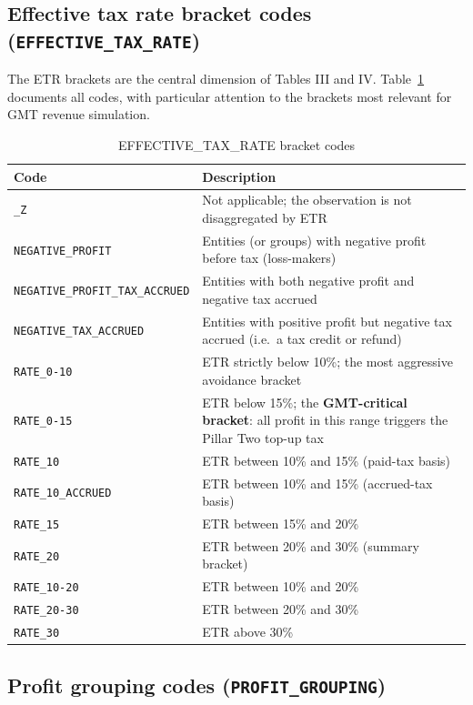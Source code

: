 \documentclass[11pt,a4paper]{article}
\newcommand{\code}[1]{\texttt{#1}}
\begin{document}
\subsection{Effective tax rate bracket codes (\texttt{EFFECTIVE\_TAX\_RATE})}

The ETR brackets are the central dimension of Tables III and IV. Table~\ref{tab:etr}
documents all codes, with particular attention to the brackets most relevant for
GMT revenue simulation.

\begin{table}[H]
\centering
\caption{EFFECTIVE\_TAX\_RATE bracket codes}
\label{tab:etr}
\begin{tabular}{@{}lp{11cm}@{}}
\toprule
Code & Description \\
\midrule
\code{\_Z} & Not applicable; the observation is not disaggregated by ETR \\
\code{NEGATIVE\_PROFIT} & Entities (or groups) with negative profit before tax (loss-makers) \\
\code{NEGATIVE\_PROFIT\_TAX\_ACCRUED} & Entities with both negative profit and negative tax accrued \\
\code{NEGATIVE\_TAX\_ACCRUED} & Entities with positive profit but negative tax accrued (i.e.\ a tax credit or refund) \\
\code{RATE\_0-10} & ETR strictly below 10\%; the most aggressive avoidance bracket \\
\code{RATE\_0-15} & ETR below 15\%; the \textbf{GMT-critical bracket}: all profit in this range triggers the Pillar Two top-up tax \\
\code{RATE\_10} & ETR between 10\% and 15\% (paid-tax basis) \\
\code{RATE\_10\_ACCRUED} & ETR between 10\% and 15\% (accrued-tax basis) \\
\code{RATE\_15} & ETR between 15\% and 20\% \\
\code{RATE\_20} & ETR between 20\% and 30\% (summary bracket) \\
\code{RATE\_10-20} & ETR between 10\% and 20\% \\
\code{RATE\_20-30} & ETR between 20\% and 30\% \\
\code{RATE\_30} & ETR above 30\% \\
\bottomrule
\end{tabular}
\end{table}

\subsection{Profit grouping codes (\texttt{PROFIT\_GROUPING})}
\end{document}
